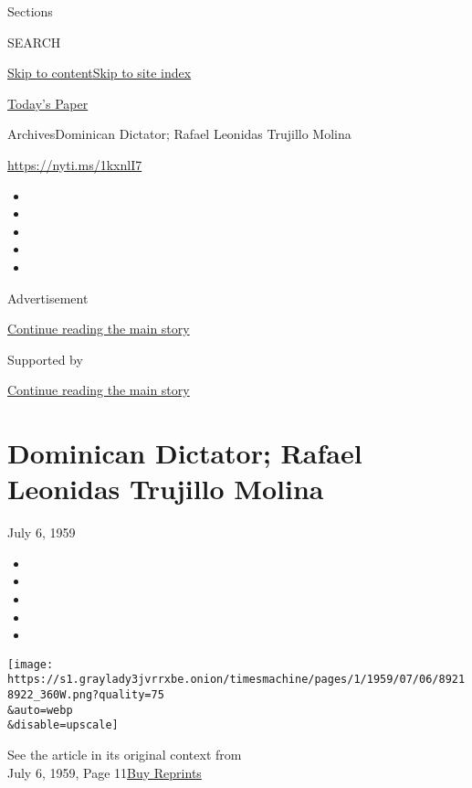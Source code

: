 Sections

SEARCH

\protect\hyperlink{site-content}{Skip to
content}\protect\hyperlink{site-index}{Skip to site index}

\href{https://myaccount.nytimes3xbfgragh.onion/auth/login?response_type=cookie\&client_id=vi}{}

\href{https://www.nytimes3xbfgragh.onion/section/todayspaper}{Today's
Paper}

Archives\textbar{}Dominican Dictator; Rafael Leonidas Trujillo Molina

\url{https://nyti.ms/1kxnlI7}

\begin{itemize}
\item
\item
\item
\item
\item
\end{itemize}

Advertisement

\protect\hyperlink{after-top}{Continue reading the main story}

Supported by

\protect\hyperlink{after-sponsor}{Continue reading the main story}

\hypertarget{dominican-dictator-rafael-leonidas-trujillo-molina}{%
\section{Dominican Dictator; Rafael Leonidas Trujillo
Molina}\label{dominican-dictator-rafael-leonidas-trujillo-molina}}

July 6, 1959

\begin{itemize}
\item
\item
\item
\item
\item
\end{itemize}

\texttt{[image: https://s1.graylady3jvrrxbe.onion/timesmachine/pages/1/1959/07/06/89218922\_360W.png?quality=75\\\&auto=webp\\\&disable=upscale]}

See the article in its original context from\\
July 6, 1959, Page
11\href{https://store.nytimes3xbfgragh.onion/collections/new-york-times-page-reprints?utm_source=nytimes\&utm_medium=article-page\&utm_campaign=reprints}{Buy
Reprints}


